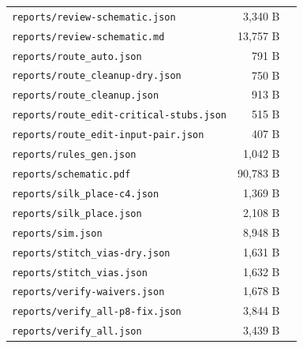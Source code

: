 \documentclass[11pt,a4paper]{article}
\begin{document}
{\begin{longtable}{p{9cm}rp{4cm}}
\texttt{reports/review-schematic.json} & 3,340 B &  \\
\texttt{reports/review-schematic.md} & 13,757 B &  \\
\texttt{reports/route\_auto.json} & 791 B &  \\
\texttt{reports/route\_cleanup-dry.json} & 750 B &  \\
\texttt{reports/route\_cleanup.json} & 913 B &  \\
\texttt{reports/route\_edit-critical-stubs.json} & 515 B &  \\
\texttt{reports/route\_edit-input-pair.json} & 407 B &  \\
\texttt{reports/rules\_gen.json} & 1,042 B &  \\
\texttt{reports/schematic.pdf} & 90,783 B &  \\
\texttt{reports/silk\_place-c4.json} & 1,369 B &  \\
\texttt{reports/silk\_place.json} & 2,108 B &  \\
\texttt{reports/sim.json} & 8,948 B &  \\
\texttt{reports/stitch\_vias-dry.json} & 1,631 B &  \\
\texttt{reports/stitch\_vias.json} & 1,632 B &  \\
\texttt{reports/verify-waivers.json} & 1,678 B &  \\
\texttt{reports/verify\_all-p8-fix.json} & 3,844 B &  \\
\texttt{reports/verify\_all.json} & 3,439 B &  \\
\bottomrule
\end{longtable}
}
\end{document}
